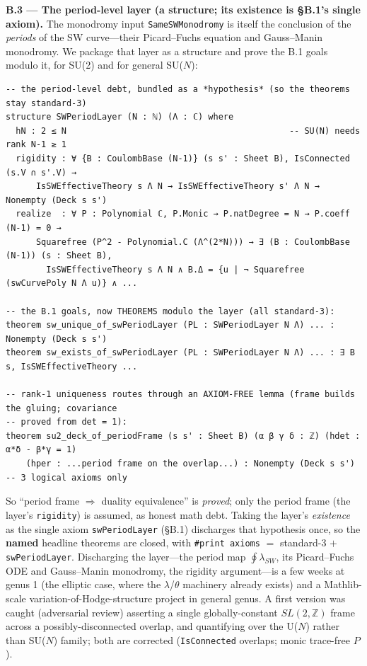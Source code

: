 \documentclass[11pt]{article}
\newcommand{\code}[1]{\texttt{#1}}
\begin{document}
\medskip
\noindent\textbf{B.3 --- The period-level layer (a structure; its existence is \S B.1's single axiom).} The monodromy input
\code{SameSWMonodromy} is itself the conclusion of the \emph{periods} of the SW curve---their
Picard--Fuchs equation and Gauss--Manin monodromy. We package that layer as a structure and prove
the B.1 goals modulo it, for SU(2) and for general SU($N$):

\begin{Verbatim}
-- the period-level debt, bundled as a *hypothesis* (so the theorems stay standard-3)
structure SWPeriodLayer (N : ℕ) (Λ : ℂ) where
  hN : 2 ≤ N                                            -- SU(N) needs rank N-1 ≥ 1
  rigidity : ∀ {B : CoulombBase (N-1)} (s s' : Sheet B), IsConnected (s.V ∩ s'.V) →
      IsSWEffectiveTheory s Λ N → IsSWEffectiveTheory s' Λ N → Nonempty (Deck s s')
  realize  : ∀ P : Polynomial ℂ, P.Monic → P.natDegree = N → P.coeff (N-1) = 0 →
      Squarefree (P^2 - Polynomial.C (Λ^(2*N))) → ∃ (B : CoulombBase (N-1)) (s : Sheet B),
        IsSWEffectiveTheory s Λ N ∧ B.Δ = {u | ¬ Squarefree (swCurvePoly N Λ u)} ∧ ...

-- the B.1 goals, now THEOREMS modulo the layer (all standard-3):
theorem sw_unique_of_swPeriodLayer (PL : SWPeriodLayer N Λ) ... : Nonempty (Deck s s')
theorem sw_exists_of_swPeriodLayer (PL : SWPeriodLayer N Λ) ... : ∃ B s, IsSWEffectiveTheory ...

-- rank-1 uniqueness routes through an AXIOM-FREE lemma (frame builds the gluing; covariance
-- proved from det = 1):
theorem su2_deck_of_periodFrame (s s' : Sheet B) (α β γ δ : ℤ) (hdet : α*δ - β*γ = 1)
    (hper : ...period frame on the overlap...) : Nonempty (Deck s s')  -- 3 logical axioms only
\end{Verbatim}

\noindent So ``period frame $\Rightarrow$ duality equivalence'' is \emph{proved}; only the period
frame (the layer's \code{rigidity}) is assumed, as honest math debt. Taking the layer's
\emph{existence} as the single axiom \code{swPeriodLayer} (\S B.1) discharges that hypothesis once,
so the \textbf{named} headline theorems are closed, with \code{\#print axioms} $=$ standard-3 $+$
\code{swPeriodLayer}. Discharging the layer---the
period map $\oint \lambda_{SW}$, its Picard--Fuchs ODE and Gauss--Manin monodromy, the rigidity
argument---is a few weeks at genus 1 (the elliptic case, where the $\lambda$/$\theta$ machinery
already exists) and a Mathlib-scale variation-of-Hodge-structure project in general genus. A first
version was caught (adversarial review) asserting a single globally-constant $SL(2,\mathbb{Z})$
frame across a possibly-disconnected overlap, and quantifying over the U($N$) rather than SU($N$)
family; both are corrected (\code{IsConnected} overlaps; monic trace-free $P$).
\end{document}
